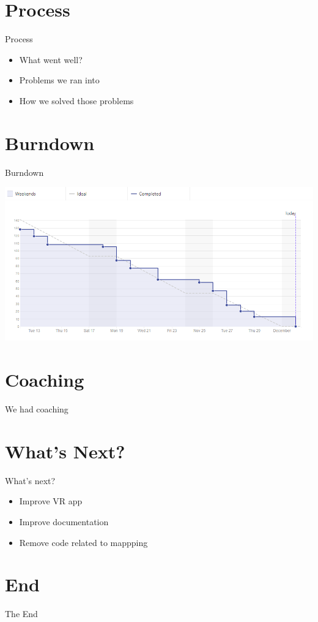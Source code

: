 \documentclass{beamer}
\begin{document}
\section{Process}
\begin{frame}{Process}
    \begin{itemize}
        \item What went well?
        \item Problems we ran into
        \item How we solved those problems
    \end{itemize}
\end{frame}

\section{Burndown}
\begin{frame}{Burndown}
    \begin{center}
      \includegraphics[width=\linewidth]{images/burndown.png}
    \end{center}
\end{frame}

\section{Coaching}
\begin{frame}
\Huge{\centerline{We had coaching}}
\end{frame}

\section{What's Next? }
\begin{frame}{What's next?}
    \begin{itemize}
        \item Improve VR app
        \item Improve documentation
        \item Remove code related to mappping
    \end{itemize}
\end{frame}

\section{End}
\begin{frame}
\Huge{\centerline{The End}}
\end{frame}
\end{document}
